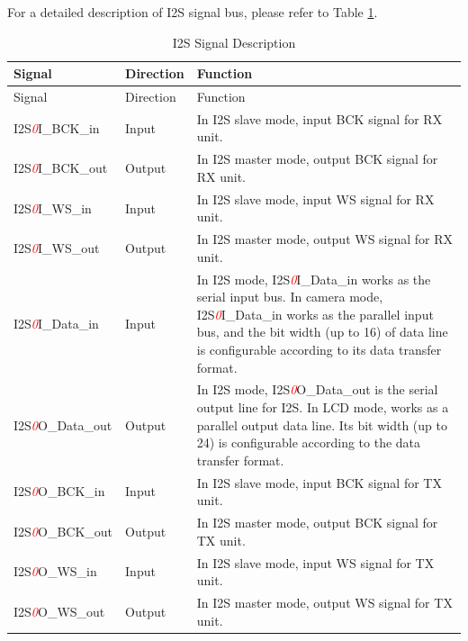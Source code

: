 \documentclass[main\_\_EN.tex]{subfiles}
\begin{document}
For a detailed description of I2S signal bus, please refer to Table \ref{table:I2S 信号总线描述}.

\begin{longtable}{|p{2.6cm}|p{1.5cm}|p{11.5cm}|}
\caption{I2S Signal Description} \label{table:I2S 信号总线描述} \\
\hline
\rowcolor{lightgray}
Signal & Direction & Function \\
\hline
\endfirsthead

\hline
\rowcolor{lightgray}
Signal & Direction & Function \\
\hline
\endhead

I2S\textcolor{red}{\it{0}}I\_BCK\_in  & Input  & In I2S slave mode, input BCK signal for RX unit. \\
\hline
I2S\textcolor{red}{\it{0}}I\_BCK\_out & Output & In I2S master mode, output BCK signal for RX unit. \\
\hline
I2S\textcolor{red}{\it{0}}I\_WS\_in   & Input  & In I2S slave mode, input WS signal for RX unit. \\
\hline
I2S\textcolor{red}{\it{0}}I\_WS\_out  & Output & In I2S master mode, output WS signal for RX unit. \\
\hline
\vspace{0.6em}I2S\textcolor{red}{\it{0}}I\_Data\_in & \vspace{0.6em}Input  & In I2S mode, I2S\textcolor{red}{\it{0}}I\_Data\_in works as the serial input bus. In camera mode, I2S\textcolor{red}{\it{0}}I\_Data\_in works as the parallel input bus, and the bit width (up to 16) of data line is configurable according to its data transfer format. \\
\hline
\vspace{0.6em}I2S\textcolor{red}{\it{0}}O\_Data\_out & \vspace{0.6em}Output & In I2S mode, I2S\textcolor{red}{\it{0}}O\_Data\_out is the serial output line for I2S. In LCD mode, works as a parallel output data line. Its bit width (up to 24) is configurable according to the data transfer format. \\
\hline
I2S\textcolor{red}{\it{0}}O\_BCK\_in   & Input  & In I2S slave mode, input BCK signal for TX unit. \\
\hline
I2S\textcolor{red}{\it{0}}O\_BCK\_out  & Output & In I2S master mode, output BCK signal for TX unit. \\
\hline
I2S\textcolor{red}{\it{0}}O\_WS\_in    & Input  & In I2S slave mode, input WS signal for TX unit. \\
\hline
I2S\textcolor{red}{\it{0}}O\_WS\_out   & Output & In I2S master mode, output WS signal for TX unit. \\

\end{longtable}
\end{document}
